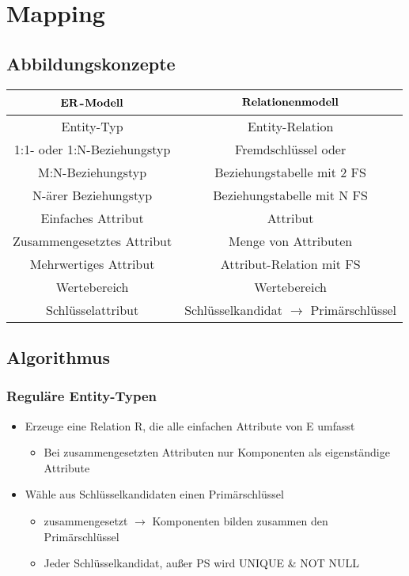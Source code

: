 \section{Mapping}
\subsection{Abbildungskonzepte}
\begin{tabular}{c|c}
	$\bold{ER}$-$\bold{Modell}$ & $\bold{Relationenmodell}$ \\
	\hline
	Entity-Typ & \glqq{}Entity\grqq{}-Relation \\
	1:1- oder 1:N-Beziehungstyp & Fremdschlüssel oder \\
	M:N-Beziehungstyp & Beziehungstabelle mit 2 FS \\
	N-ärer Beziehungstyp & Beziehungstabelle mit N FS \\
	Einfaches Attribut & Attribut \\
	Zusammengesetztes Attribut & Menge von Attributen \\
	Mehrwertiges Attribut & \glqq{}Attribut\grqq{}-Relation mit FS \\
	Wertebereich & Wertebereich \\
	Schlüsselattribut & Schlüsselkandidat $\to$ Primärschlüssel 
\end{tabular}
\subsection{Algorithmus}
\subsubsection{Reguläre Entity-Typen}
\begin{itemize}
	\item Erzeuge eine Relation R, die alle einfachen Attribute von E umfasst
		\begin{itemize}
			\item Bei zusammengesetzten Attributen nur Komponenten als eigenständige Attribute 
		\end{itemize}
	\item Wähle aus Schlüsselkandidaten einen Primärschlüssel
		\begin{itemize}
			\item zusammengesetzt $\to$ Komponenten bilden zusammen den Primärschlüssel
			\item Jeder Schlüsselkandidat, außer PS wird UNIQUE \& NOT NULL
		\end{itemize}
\end{itemize}

